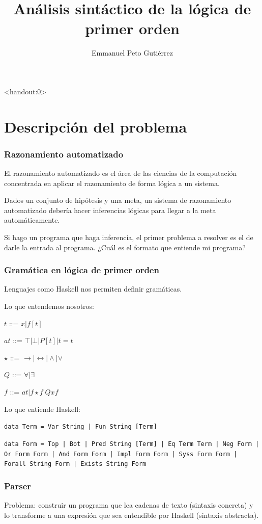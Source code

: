 \documentclass{beamer}
\title{Análisis sintáctico de la lógica de primer orden}
\author{Emmanuel Peto Gutiérrez}
\institute{IIMAS \\ UNAM}
\begin{document}
\begin{frame}<handout:0>
\titlepage
\end{frame}

\section{Descripción del problema}

\begin{frame}
\frametitle{Razonamiento automatizado}

El razonamiento automatizado es el área de las ciencias de la computación concentrada en aplicar el razonamiento de forma lógica a un sistema.

Dados un conjunto de hipótesis y una meta, un sistema de razonamiento automatizado debería hacer inferencias lógicas para llegar a la meta automáticamente.

\pause

Si hago un programa que haga inferencia, el primer problema a resolver es el de darle la entrada al programa. ¿Cuál es el formato que entiende mi programa?

\end{frame}

\begin{frame}
\frametitle{Gramática en lógica de primer orden}

Lenguajes como Haskell nos permiten definir gramáticas.

Lo que entendemos nosotros:

$t$ ::= $x | f [t]$

$at$ ::= $\top | \bot | P [t] | t=t$

$\star$ ::= $\rightarrow | \leftrightarrow | \land | \lor$

$Q$ ::= $\forall | \exists$

$f$ ::= $at | f \star f | Q x f$

\pause

Lo que entiende Haskell:

\texttt{data Term = Var String | Fun String [Term]}

\texttt{data Form  = Top | Bot | Pred String [Term] | Eq Term Term | Neg Form | Or Form Form | And Form Form | Impl Form Form | Syss Form Form | Forall String Form | Exists String Form}

\end{frame}

\begin{frame}
\frametitle{Parser}

Problema: construir un programa que lea cadenas de texto (sintaxis concreta) y lo transforme a una expresión que sea entendible por Haskell (sintaxis abstracta).

\end{frame}
\end{document}
